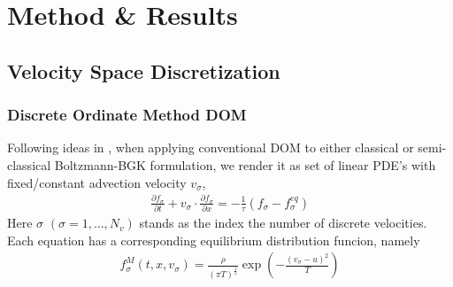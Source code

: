 \section{Method \& Results}

\subsection{Velocity Space Discretization}
\begin{frame} \frametitle{Discrete Ordinate Method DOM}
	Following ideas in \cite{Yang1995323}, when applying conventional DOM to either classical or semi-classical Boltzmann-BGK formulation, we render it as set of linear PDE's with fixed/constant advection velocity $v_\sigma$,
	\begin{align}
		\frac{\partial{f_\sigma}}{\partial{t}} +
		v_\sigma\cdot\frac{\partial{f_\sigma}}{\partial x} = 
		-\frac{1}{\tau}(f_\sigma-f^{eq}_\sigma)
	\end{align}
Here $\sigma$ $(\sigma = 1,\dots,N_v)$ stands as the index the number of discrete velocities. Each equation has a corresponding equilibrium distribution funcion, namely
	\begin{align}
		f_\sigma^{M}(t,x,v_\sigma)= \frac{\rho}{(\pi T)^{\frac{1}{2}}} \exp\left({-\frac{(v_\sigma-u)^2}{T}} \right)
	\end{align}
\end{frame}



